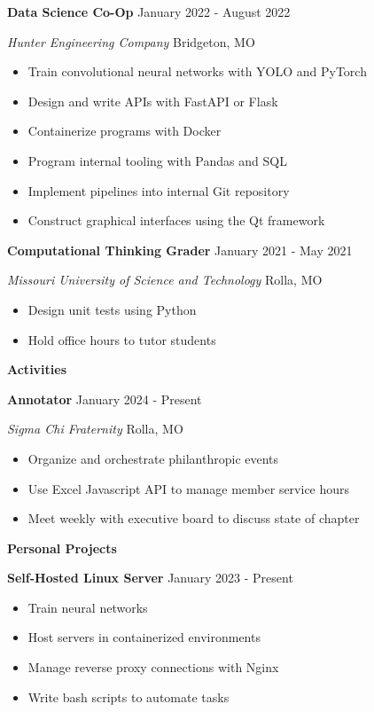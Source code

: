 \documentclass[11pt]{article}
\begin{document}

\textbf{Data Science Co-Op} \hfill January 2022 - August 2022

\textsl{Hunter Engineering Company} \hfill Bridgeton, MO
\begin{itemize}[noitemsep]
    \item Train convolutional neural networks with YOLO and PyTorch
    \item Design and write APIs with FastAPI or Flask
    \item Containerize programs with Docker
    \item Program internal tooling with Pandas and SQL
    \item Implement pipelines into internal Git repository
    \item Construct graphical interfaces using the Qt framework
\end{itemize}


\textbf{Computational Thinking Grader} \hfill January 2021 - May 2021

\textsl{Missouri University of Science and Technology} \hfill Rolla, MO
\begin{itemize}[noitemsep]
    \item Design unit tests using Python
    \item Hold office hours to tutor students
\end{itemize}

\begin{center}
    \textbf{Activities}
\end{center}

\textbf{Annotator} \hfill January 2024 - Present

\textsl{Sigma Chi Fraternity}	\hfill Rolla, MO
\begin{itemize}[noitemsep]
    \item Organize and orchestrate philanthropic events
    \item Use Excel Javascript API to manage member service hours
    \item Meet weekly with executive board to discuss state of chapter
\end{itemize}

\begin{center}
    \textbf{Personal Projects}
\end{center}

\textbf{Self-Hosted Linux Server} \hfill January 2023 - Present
\begin{itemize}[noitemsep]
    \item Train neural networks
    \item Host servers in containerized environments
    \item Manage reverse proxy connections with Nginx
    \item Write bash scripts to automate tasks
\end{itemize}
\end{document}
